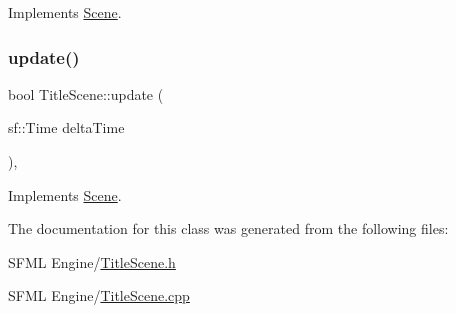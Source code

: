 Implements \hyperlink{class_scene_af25e4d2c998aca4e95899fb67488e815}{Scene}.

\mbox{\label{class_title_scene_a17ce1b5b9f6f8ca44a6ed3326e9e5d0a}} 
\subsubsection{\texorpdfstring{update()}{update()}}
{\footnotesize\ttfamily bool Title\+Scene\+::update (\begin{DoxyParamCaption}\item[{sf\+::\+Time}]{delta\+Time }\end{DoxyParamCaption})\hspace{0.3cm}{\ttfamily [override]}, {\ttfamily [virtual]}}



Implements \hyperlink{class_scene_a72683c984a1da2ce4f757705e93730f2}{Scene}.



The documentation for this class was generated from the following files\+:\begin{DoxyCompactItemize}
\item 
S\+F\+M\+L Engine/\hyperlink{_title_scene_8h}{Title\+Scene.\+h}\item 
S\+F\+M\+L Engine/\hyperlink{_title_scene_8cpp}{Title\+Scene.\+cpp}\end{DoxyCompactItemize}
